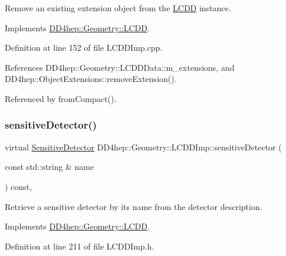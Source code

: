 Remove an existing extension object from the \hyperlink{class_d_d4hep_1_1_geometry_1_1_l_c_d_d}{L\+C\+DD} instance. 

Implements \hyperlink{class_d_d4hep_1_1_geometry_1_1_l_c_d_d_a05c121b360d248ce34a2d9337df9f49b}{D\+D4hep\+::\+Geometry\+::\+L\+C\+DD}.



Definition at line 152 of file L\+C\+D\+D\+Imp.\+cpp.



References D\+D4hep\+::\+Geometry\+::\+L\+C\+D\+D\+Data\+::m\+\_\+extensions, and D\+D4hep\+::\+Object\+Extensions\+::remove\+Extension().



Referenced by from\+Compact().

\hypertarget{class_d_d4hep_1_1_geometry_1_1_l_c_d_d_imp_a4a3de80d993e90db97a90b0e69e90e20}{}\label{class_d_d4hep_1_1_geometry_1_1_l_c_d_d_imp_a4a3de80d993e90db97a90b0e69e90e20} 
\subsubsection{\texorpdfstring{sensitive\+Detector()}{sensitiveDetector()}}
{\footnotesize\ttfamily virtual \hyperlink{class_d_d4hep_1_1_geometry_1_1_sensitive_detector}{Sensitive\+Detector} D\+D4hep\+::\+Geometry\+::\+L\+C\+D\+D\+Imp\+::sensitive\+Detector (\begin{DoxyParamCaption}\item[{const std\+::string \&}]{name }\end{DoxyParamCaption}) const\hspace{0.3cm}{\ttfamily [inline]}, {\ttfamily [virtual]}}



Retrieve a sensitive detector by it\textquotesingle{}s name from the detector description. 



Implements \hyperlink{class_d_d4hep_1_1_geometry_1_1_l_c_d_d_af476b8241b93e82350ec1e5cbf145941}{D\+D4hep\+::\+Geometry\+::\+L\+C\+DD}.



Definition at line 211 of file L\+C\+D\+D\+Imp.\+h.



